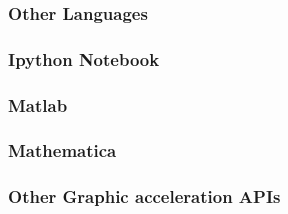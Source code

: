 \subsubsection{Other Languages}
\subsubsection{Ipython Notebook}
\subsubsection{Matlab}
\subsubsection{Mathematica}
\subsubsection{Other Graphic acceleration APIs}